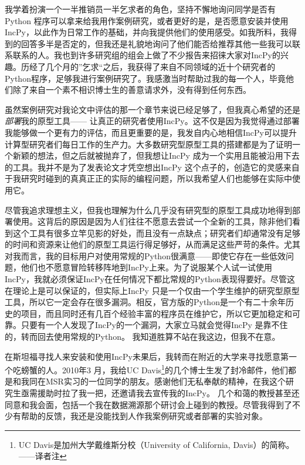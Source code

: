 \documentclass[letter,12pt]{book}
\begin{document}
\begin{CJK}{UTF8}{gbsn}
我学着扮演一个一半推销员一半乞求者的角色，坚持不懈地询问同学是否有Python 程序可以拿来给我用作案例研究，或者更好的是，是否愿意安装并使用IncPy，以此作为日常工作的基础，并向我提供他们的使用感受。如我所料，我得到的回答多半是否定的，但我还是礼貌地询问了他们能否给推荐其他一些我可以联系联系的人。我也到许多研究组的组会上做了不少报告来招徕大家对IncPy的兴趣。历经了几个月的”乞求“之后，我获得了来自不同领域的近十个研究者的Python程序，足够我进行案例研究了。我感激当时帮助过我的每一个人，毕竟他们除了来自一个素不相识博士生的善意请求外，没有得到任何东西。

\breakline

虽然案例研究对我论文中评估的那一个章节来说已经足够了，但我真心希望的还是\emph{部署}我的原型工具—— 让真正的研究者使用IncPy。这不仅是因为我觉得通过部署我能够做一个更有力的评估，而且更重要的是，我发自内心地相信IncPy可以提升计算型研究者们每日工作的生产力。大多数研究型原型工具的搭建都是为了证明一个新颖的想法，但之后就被抛弃了，但我想让IncPy 成为一个实用且能被沿用下去的工具。我并不是为了发表论文才凭空想出IncPy 这个点子的，创造它的灵感来自于我研究时碰到的真真正正的实际的编程问题，所以我希望人们也能够在实际中使用它。

尽管我追求理想主义，但我也理解为什么几乎没有研究型的原型工具成功地得到部署使用。这背后的原因是因为人们往往不愿意去尝试一个全新的工具，除非他们看到这个工具有很多立竿见影的好处，而且没有一点缺点；研究者们却通常没有足够的时间和资源来让他们的原型工具运行得足够好，从而满足这些严苛的条件。尤其对我而言，我的目标用户对使用常规的Python很满意——即使它存在一些低效问题，他们也不愿意冒险转移阵地到IncPy上来。为了说服某个人试一试使用IncPy，我就必须保证IncPy在任何情况下都比常规的Python表现得要好。尽管这在理论上是可以保证的，但实际上IncPy 只是一个仅由一个学生维护的研究型原型工具，所以它一定会存在很多漏洞。相反，官方版的Python是一个有二十余年历史的项目，而且同时还有几百个经验丰富的程序员在维护它，所以它更加稳定和可靠。只要有一个人发现了IncPy的一个漏洞，大家立马就会觉得IncPy 是靠不住的，转而回去使用常规的Python。 我知道胜算不站在我这边，但我不在意。

在斯坦福寻找人来安装和使用IncPy未果后，我转而在附近的大学来寻找愿意第一个吃螃蟹的人。2010年3 月，我给UC Davis\footnote{UC Davis是加州大学戴维斯分校（University of California, Davis）的简称。——译者注}的几个博士生发了封冷邮件，他们都是和我同在MSR实习的一位同学的朋友。感谢他们无私奉献的精神，在我这个研究生亟需援助时拉了我一把，还邀请我去宣传我的IncPy。 几个和蔼的教授甚至还同意和我会面，包括一个我在数据溯源那个研讨会上碰到的教授。尽管我得到了不少有帮助的反馈，我还是没能找到人作我案例研究或者部署的实验对象。


\end{CJK}
\end{document}
